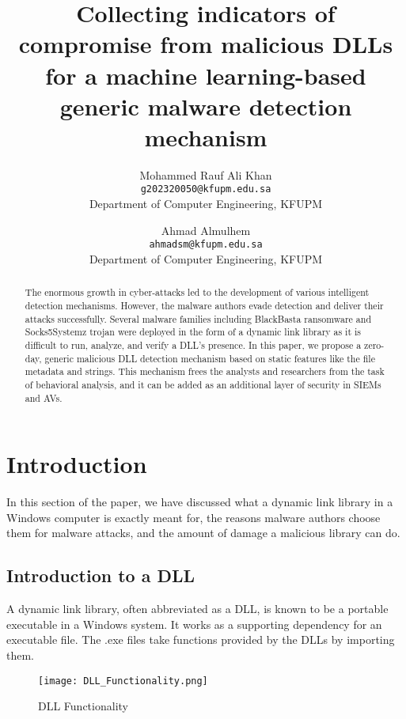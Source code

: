 \documentclass{article}
\begin{document}
\title{Collecting indicators of compromise from malicious DLLs for a machine learning-based generic malware detection mechanism}
\author{
    Mohammed Rauf Ali Khan\\
    \texttt{g202320050@kfupm.edu.sa}\\
    Department of Computer Engineering, KFUPM
    \and
    Ahmad Almulhem\\
    \texttt{ahmadsm@kfupm.edu.sa}\\
    Department of Computer Engineering, KFUPM
}
\date{}
\maketitle

\begin{abstract}
The enormous growth in cyber-attacks led to the development of various intelligent detection mechanisms. However, the malware authors evade detection and deliver their attacks successfully. Several malware families including BlackBasta ransomware and Socks5Systemz trojan were deployed in the form of a dynamic link library as it is difficult to run, analyze, and verify a DLL’s presence. In this paper, we propose a zero-day, generic malicious DLL detection mechanism based on static features like the file metadata and strings. This mechanism frees the analysts and researchers from the task of behavioral analysis, and it can be added as an additional layer of security in SIEMs and AVs.
\end{abstract}

\section{Introduction}
In this section of the paper, we have discussed what a dynamic link library in a Windows computer is exactly meant for, the reasons malware authors choose them for malware attacks, and the amount of damage a malicious library can do.

\subsection{Introduction to a DLL}
A dynamic link library, often abbreviated as a DLL\cite{dll_intro}, is known to be a portable executable in a Windows system. It works as a supporting dependency for an executable file. The .exe files take functions provided by the DLLs by importing them.

\begin{figure}[h]
    \centering
    \texttt{[image: DLL\_Functionality.png]}
    \caption{DLL Functionality}
    \label{fig:dll_functionality}
\end{figure}
\end{document}
